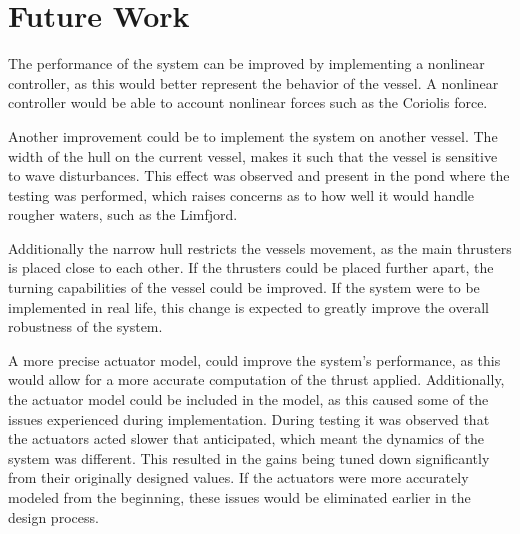 \chapter{Future Work}

The performance of the system can be improved by implementing a nonlinear controller, as this would better represent the behavior of the vessel. A nonlinear controller would be able to account nonlinear forces such as the Coriolis force. 

Another improvement could be to implement the system on another vessel. The width of the hull on the current vessel, makes it such that the vessel is sensitive to wave disturbances. 
This effect was observed and present in the pond where the testing was performed, which raises concerns as to how well it would handle rougher waters, such as the Limfjord. 

Additionally the narrow hull restricts the vessels movement, as the main thrusters is placed close to each other. 
If the thrusters could be placed further apart, the turning capabilities of the vessel could be improved. 
If the system were to be implemented in real life, this change is expected to greatly improve the overall robustness of the system. 

A more precise actuator model, could improve the system's performance, as this would allow for a more accurate computation of the thrust applied. 
Additionally, the actuator model could be included in the model, as this caused some of the issues experienced during implementation. 
During testing it was observed that the actuators acted slower that anticipated, which meant the dynamics of the system was different. 
This resulted in the gains being tuned down significantly from their originally designed values. 
If the actuators were more accurately modeled from the beginning, these issues would be eliminated earlier in the design process. 


